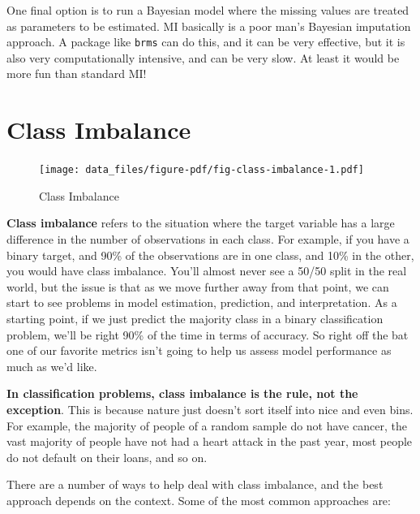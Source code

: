 \documentclass[
  letterpaper,
]{krantz}
\begin{document}
One final option is to run a Bayesian model where the missing values are
treated as parameters to be estimated. MI basically is a poor man's
Bayesian imputation approach. A package like \texttt{brms} can do this,
and it can be very effective, but it is also very computationally
intensive, and can be very slow. At least it would be more fun than
standard MI!

\section{Class Imbalance}\label{sec-class-imbalance}

\begin{figure}

{\centering \texttt{[image: data\_files/figure-pdf/fig-class-imbalance-1.pdf]}

}

\caption{\label{fig-class-imbalance}Class Imbalance}

\end{figure}

\textbf{Class imbalance} refers to the situation where the target
variable has a large difference in the number of observations in each
class. For example, if you have a binary target, and 90\% of the
observations are in one class, and 10\% in the other, you would have
class imbalance. You'll almost never see a 50/50 split in the real
world, but the issue is that as we move further away from that point, we
can start to see problems in model estimation, prediction, and
interpretation. As a starting point, if we just predict the majority
class in a binary classification problem, we'll be right 90\% of the
time in terms of accuracy. So right off the bat one of our favorite
metrics isn't going to help us assess model performance as much as we'd
like.

\textbf{In classification problems, class imbalance is the rule, not the
exception}. This is because nature just doesn't sort itself into nice
and even bins. For example, the majority of people of a random sample do
not have cancer, the vast majority of people have not had a heart attack
in the past year, most people do not default on their loans, and so on.

There are a number of ways to help deal with class imbalance, and the
best approach depends on the context. Some of the most common approaches
are:
\end{document}
